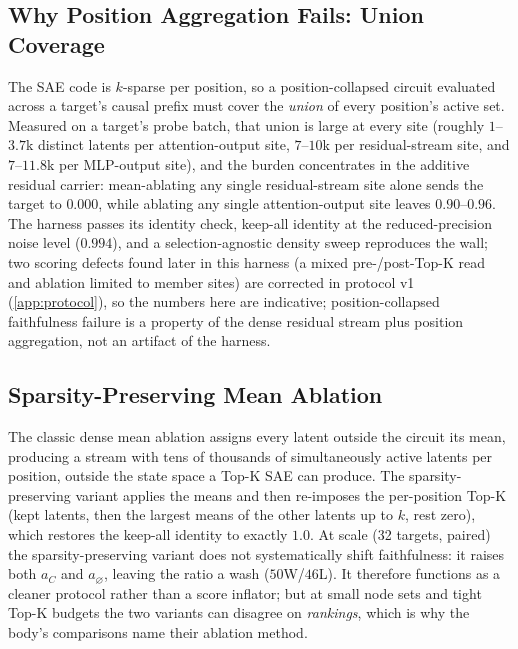 \documentclass[10pt]{article}
\begin{document}
\subsection{Why Position Aggregation Fails: Union Coverage}
\label{app:union-coverage}
The SAE code is $k$-sparse per position, so a position-collapsed circuit evaluated across a target's causal prefix must cover the \emph{union} of every position's active set.
Measured on a target's probe batch, that union is large at every site (roughly $1$--$3.7$k distinct latents per attention-output site, $7$--$10$k per residual-stream site, and $7$--$11.8$k per MLP-output site), and the burden concentrates in the additive residual carrier: mean-ablating any single residual-stream site alone sends the target to $0.000$, while ablating any single attention-output site leaves $0.90$--$0.96$.
The harness passes its identity check, keep-all identity at the reduced-precision noise level ($0.994$), and a selection-agnostic density sweep reproduces the wall; two scoring defects found later in this harness (a mixed pre-/post-Top-K read and ablation limited to member sites) are corrected in protocol v1 (\cref{app:protocol}), so the numbers here are indicative; position-collapsed faithfulness failure is a property of the dense residual stream plus position aggregation, not an artifact of the harness.

\subsection{Sparsity-Preserving Mean Ablation}
\label{app:respect-topk}
The classic dense mean ablation assigns every latent outside the circuit its mean, producing a stream with tens of thousands of simultaneously active latents per position, outside the state space a Top-K SAE can produce.
The sparsity-preserving variant applies the means and then re-imposes the per-position Top-K (kept latents, then the largest means of the other latents up to $k$, rest zero), which restores the keep-all identity to exactly $1.0$.
At scale (32 targets, paired) the sparsity-preserving variant does not systematically shift faithfulness: it raises both $a_C$ and $a_{\varnothing}$, leaving the ratio a wash ($50$W/$46$L).
It therefore functions as a cleaner protocol rather than a score inflator; but at small node sets and tight Top-K budgets the two variants can disagree on \emph{rankings}, which is why the body's comparisons name their ablation method.
\end{document}
